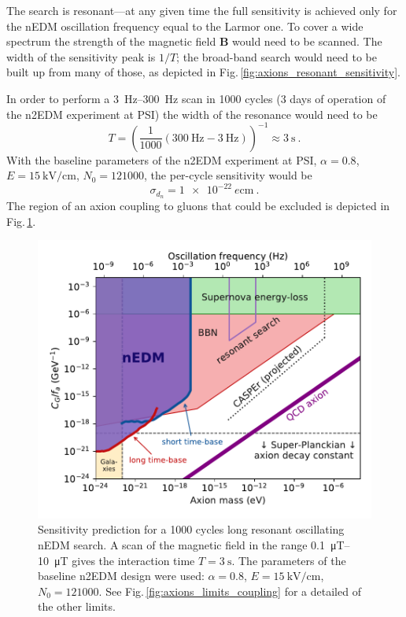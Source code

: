 The search is resonant---at any given time the full sensitivity is achieved only for the nEDM oscillation frequency equal to the Larmor one. To cover a wide spectrum the strength of the magnetic field $\mathbf{B}$ would need to be scanned. The width of the sensitivity peak is $1/T$; the broad-band search would need to be built up from many of those, as depicted in Fig.\,\ref{fig:axions_resonant_sensitivity}. 

In order to perform a \SIrange[range-phrase=--]{3}{300}{\hertz} scan in 1000 cycles (3 days of operation of the n2EDM experiment at PSI) the width of the resonance would need to be
\begin{equation}
  T = {\left( \frac{1}{1000} \left( \SI{300}{\hertz} - \SI{3}{\hertz} \right)  \right)}^{-1} \approx \SI{3}{\second} \ .
\end{equation}
With the baseline parameters of the n2EDM experiment at PSI, $\alpha = 0.8$, $E = \SI{15}{\kilo\volt\per\centi\metre}$, $N_0 = \num{121000}$, the per-cycle sensitivity would be 
\begin{equation}
  \sigma_{d_n} = \SI{1e-22}{\elementarycharge\centi\metre} \ .
\end{equation}
The region of an axion coupling to gluons that could be excluded is depicted in Fig.\,\ref{fig:axions_prediction}.

\begin{figure}
  \centering
  \includegraphics[width=\linewidth]{gfx/axions/resonant_search_exclusion_1000cycles_n2EDM.pdf}
  \caption{Sensitivity prediction for a 1000 cycles long resonant oscillating nEDM search. A scan of the magnetic field in the range \SIrange[range-phrase=--]{0.1}{10}{\micro\tesla} gives the interaction time $T = \SI{3}{\second}$. The parameters of the baseline n2EDM design were used: $\alpha = 0.8$, $E = \SI{15}{\kilo\volt\per\centi\metre}$, $N_0 = \num{121000}$. See Fig.\,\ref{fig:axions_limits_coupling} for a detailed of the other limits.}\label{fig:axions_prediction}
\end{figure}

